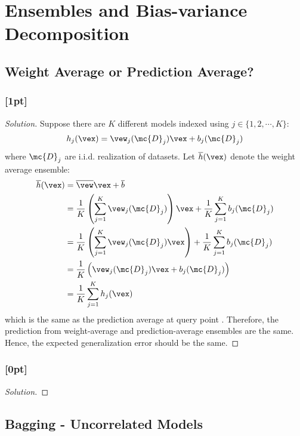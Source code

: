 \documentclass{article}
\begin{document}
	
	\section{Ensembles and Bias-variance Decomposition}
	\subsection{Weight Average or Prediction Average?}
	\subsubsection{[1pt]}
	\begin{proof}[Solution]
		Suppose there are $K$ different models indexed using $j \in \{1, 2, \cdots, K\}$:
		\begin{align}
			h_j(\vex) = \vew_j(\mc{D}_j)\vex + b_j(\mc{D}_j)
		\end{align}
		where $\mc{D}_j$ are i.i.d. realization of datasets. Let $\overline{h}(\vex)$ denote the weight average ensemble:
		\begin{align}
			\overline{h}(\vex) &= \overline{\vew} \vex + \overline{b} \\
			&= \frac{1}{K} \left(\sum_{j=1}^K \vew_j(\mc{D}_j) \right) \vex + \frac{1}{K} \sum_{j=1}^K b_j(\mc{D}_j) \\
			&= \frac{1}{K} \left(\sum_{j=1}^K \vew_j(\mc{D}_j) \vex \right) + \frac{1}{K} \sum_{j=1}^K b_j(\mc{D}_j) \\
			&= \frac{1}{K} \left(
			\vew_j(\mc{D}_j) \vex + b_j(\mc{D}_j)
			\right) \\
			&= \frac{1}{K} \sum_{j=1}^K h_j(\vex)
		\end{align}
		which is the same as the prediction average at query point \vex.
		Therefore, the prediction from weight-average and prediction-average ensembles are the same. Hence, the expected generalization error should be the same.
	\end{proof}
	
	\subsubsection{[0pt]}
	\begin{proof}[Solution]
		
	\end{proof}
	
	\subsection{Bagging - Uncorrelated Models}
\end{document}
